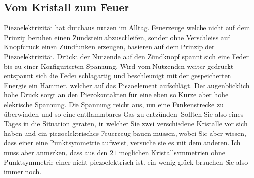 \subsection{Vom Kristall zum Feuer}
Piezoelektrizität hat durchaus nutzen im Alltag.
Feuerzeuge welche nicht auf dem Prinzip beruhen einen Zündstein abzuschleifen, 
sonder ohne Verschleiss auf Knopfdruck einen Zündfunken erzeugen, basieren auf dem Prinzip der Piezoelektrizität.
Drückt der Nutzende auf den Zündknopf spannt sich eine Feder bis zu einer Konfigurierten Spannung.
Wird vom Nutzenden weiter gedrückt entspannt sich die Feder schlagartig und beschleunigt mit der gespeicherten Energie ein Hammer,
welcher auf das Piezoelement aufschlägt.
Der augenblicklich hohe Druck sorgt an den Piezokontakten für eine eben so Kurze aber hohe elekrische Spannung.
Die Spannung reicht aus, um eine Funkenstrecke zu überwinden und so eine entflammbares Gas zu entzünden.
Sollten Sie also eines Tages in die Situation geraten, in welcher Sie zwei verschiedene Kristalle vor sich haben
und ein piezoelektrisches Feuerzeug bauen müssen,
wobei Sie aber wissen, dass einer eine Punktsymmetrie aufweist,
versuche sie es mit dem anderen.
Ich muss aber anmerken, dass aus den $21$ möglichen Kristallsymmetrien ohne Punktsymmetrie einer nicht piezoelektrisch ist.
ein wenig glück brauchen Sie also immer noch.
